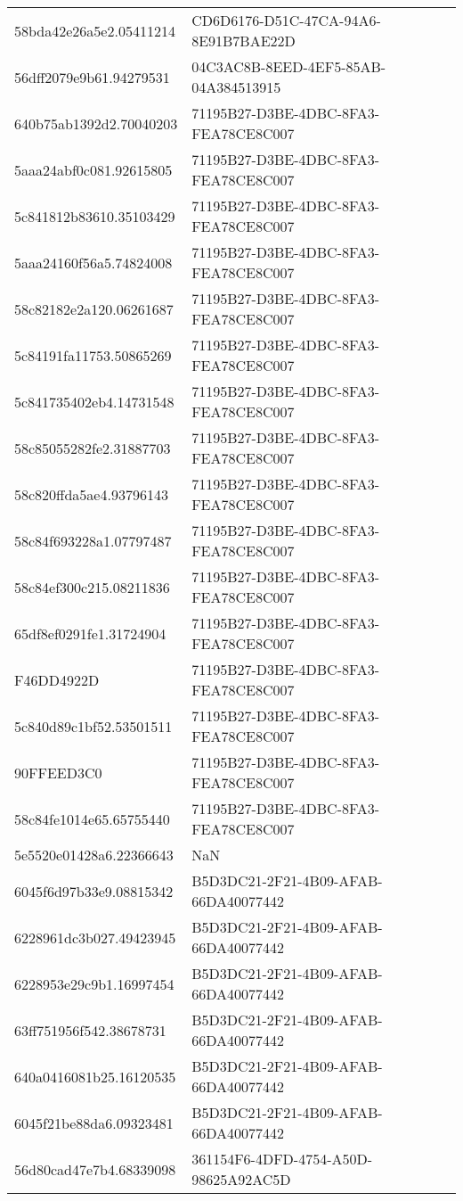 \begin{tabular}{ll}
58bda42e26a5e2.05411214 & CD6D6176-D51C-47CA-94A6-8E91B7BAE22D \\
56dff2079e9b61.94279531 & 04C3AC8B-8EED-4EF5-85AB-04A384513915 \\
640b75ab1392d2.70040203 & 71195B27-D3BE-4DBC-8FA3-FEA78CE8C007 \\
5aaa24abf0c081.92615805 & 71195B27-D3BE-4DBC-8FA3-FEA78CE8C007 \\
5c841812b83610.35103429 & 71195B27-D3BE-4DBC-8FA3-FEA78CE8C007 \\
5aaa24160f56a5.74824008 & 71195B27-D3BE-4DBC-8FA3-FEA78CE8C007 \\
58c82182e2a120.06261687 & 71195B27-D3BE-4DBC-8FA3-FEA78CE8C007 \\
5c84191fa11753.50865269 & 71195B27-D3BE-4DBC-8FA3-FEA78CE8C007 \\
5c841735402eb4.14731548 & 71195B27-D3BE-4DBC-8FA3-FEA78CE8C007 \\
58c85055282fe2.31887703 & 71195B27-D3BE-4DBC-8FA3-FEA78CE8C007 \\
58c820ffda5ae4.93796143 & 71195B27-D3BE-4DBC-8FA3-FEA78CE8C007 \\
58c84f693228a1.07797487 & 71195B27-D3BE-4DBC-8FA3-FEA78CE8C007 \\
58c84ef300c215.08211836 & 71195B27-D3BE-4DBC-8FA3-FEA78CE8C007 \\
65df8ef0291fe1.31724904 & 71195B27-D3BE-4DBC-8FA3-FEA78CE8C007 \\
F46DD4922D & 71195B27-D3BE-4DBC-8FA3-FEA78CE8C007 \\
5c840d89c1bf52.53501511 & 71195B27-D3BE-4DBC-8FA3-FEA78CE8C007 \\
90FFEED3C0 & 71195B27-D3BE-4DBC-8FA3-FEA78CE8C007 \\
58c84fe1014e65.65755440 & 71195B27-D3BE-4DBC-8FA3-FEA78CE8C007 \\
5e5520e01428a6.22366643 & NaN \\
6045f6d97b33e9.08815342 & B5D3DC21-2F21-4B09-AFAB-66DA40077442 \\
6228961dc3b027.49423945 & B5D3DC21-2F21-4B09-AFAB-66DA40077442 \\
6228953e29c9b1.16997454 & B5D3DC21-2F21-4B09-AFAB-66DA40077442 \\
63ff751956f542.38678731 & B5D3DC21-2F21-4B09-AFAB-66DA40077442 \\
640a0416081b25.16120535 & B5D3DC21-2F21-4B09-AFAB-66DA40077442 \\
6045f21be88da6.09323481 & B5D3DC21-2F21-4B09-AFAB-66DA40077442 \\
56d80cad47e7b4.68339098 & 361154F6-4DFD-4754-A50D-98625A92AC5D \\

\end{tabular}
